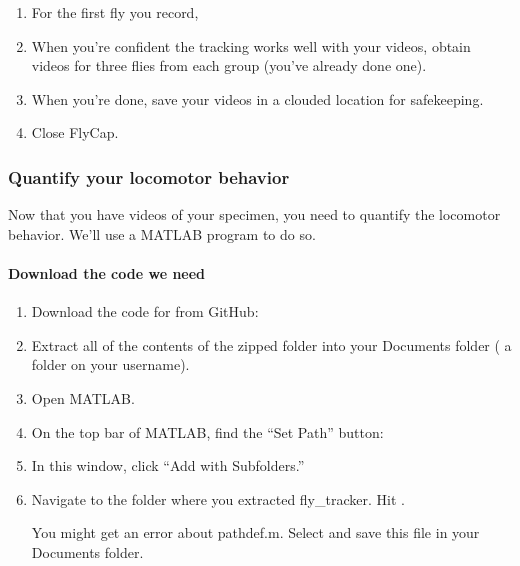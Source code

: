 \documentclass[letterpaper,10pt,english]{jupyterBook}
\begin{document}
\begin{enumerate}
\item {} 
\sphinxAtStartPar
For the first fly you record, 

\item {} 
\sphinxAtStartPar
When you’re confident the tracking works well with your videos, obtain videos for three flies from each group (you’ve already done one).

\item {} 
\sphinxAtStartPar
When you’re done, save your videos in a clouded location for safekeeping.

\item {} 
\sphinxAtStartPar
Close FlyCap.

\end{enumerate}


\subsubsection{Quantify your locomotor behavior}
\label{\detokenize{Drosophila/Day1:quantify-your-locomotor-behavior}}
\sphinxAtStartPar
Now that you have videos of your specimen, you need to quantify the locomotor behavior. We’ll use a MATLAB program to do so.


\paragraph{Download the code we need}
\label{\detokenize{Drosophila/Day1:download-the-code-we-need}}\begin{enumerate}
%
\item {} 
\sphinxAtStartPar
Download the code for  from GitHub: 

\item {} 
\sphinxAtStartPar
Extract all of the contents of the zipped folder into your  Documents folder ( a folder on your username).

\item {} 
\sphinxAtStartPar
Open MATLAB.

\item {} 
\sphinxAtStartPar
On the top bar of MATLAB, find the “Set Path” button:

\sphinxAtStartPar
{}

\item {} 
\sphinxAtStartPar
In this window, click “Add with Subfolders.”

\item {} 
\sphinxAtStartPar
Navigate to the folder where you extracted fly\_tracker. Hit .

\sphinxAtStartPar
{} You might get an error about pathdef.m. Select  and save this file in your  Documents folder.

\end{enumerate}
\end{document}
